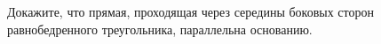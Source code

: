 \begin{ex}
	\begin{condition}
		Докажите, что прямая, проходящая через середины боковых сторон равнобедренного треугольника, параллельна основанию.
	\end{condition}
\end{ex}